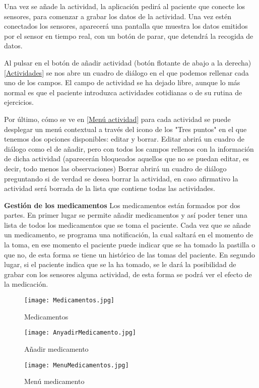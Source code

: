 Una vez se añade la actividad, la aplicación pedirá al paciente que conecte los sensores, para comenzar a grabar los datos de la actividad. Una vez estén conectados los sensores, aparecerá una pantalla que muestra los datos emitidos por el sensor en tiempo real, con un botón de parar, que detendrá la recogida de datos.
\newline

Al pulsar en el botón de añadir actividad (botón flotante de abajo a la derecha) \ref{Actividades} se nos abre un cuadro de diálogo en el que podemos rellenar cada uno de los campos. El campo de actividad se ha dejado libre, aunque lo más normal es que el paciente introduzca actividades cotidianas o de su rutina de ejercicios.
\newline

Por último, cómo se ve en \ref{Menú actividad} para cada actividad se puede desplegar un menú contextual a través del icono de los "Tres puntos" en el que tenemos dos opciones disponibles: editar y borrar. Editar abrirá un cuadro de diálogo como el de añadir, pero con todos los campos rellenos con la información de dicha actividad (aparecerán bloqueados aquellos que no se puedan editar, es decir, todo menos las observaciones) Borrar abrirá un cuadro de diálogo preguntando si de verdad se desea borrar la actividad, en caso afirmativo la actividad será borrada de la lista que contiene todas las actividades.
\newline

{\bf Gestión de los medicamentos}
\newline
\newline
Los medicamentos están formados por dos partes. En primer lugar se permite añadir medicamentos y así poder tener una lista de todos los medicamentos que se toma el paciente. Cada vez que se añade un medicamento, se programa una notificación, la cual saltará en el momento de la toma, en ese momento el paciente puede indicar que se ha tomado la pastilla o que no, de esta forma se tiene un histórico de las tomas del paciente. En segundo lugar, si el paciente indica que se la ha tomado, se le dará la posibilidad de grabar con los sensores alguna actividad, de esta forma se podrá ver el efecto de la medicación.
\begin{figure}[!htb]
  \texttt{[image: Medicamentos.jpg]}
  \caption{Medicamentos}
  \label{Medicamentos}
\endminipage\hfill
{}
  \texttt{[image: AnyadirMedicamento.jpg]}
  \caption{Añadir medicamento}
  \label{Añadir medicamento}
\endminipage\hfill
{}%
  \texttt{[image: MenuMedicamentos.jpg]}
  \caption{Menú medicamento}
  \label{Menú medicamento}
\endminipage
\end{figure}

